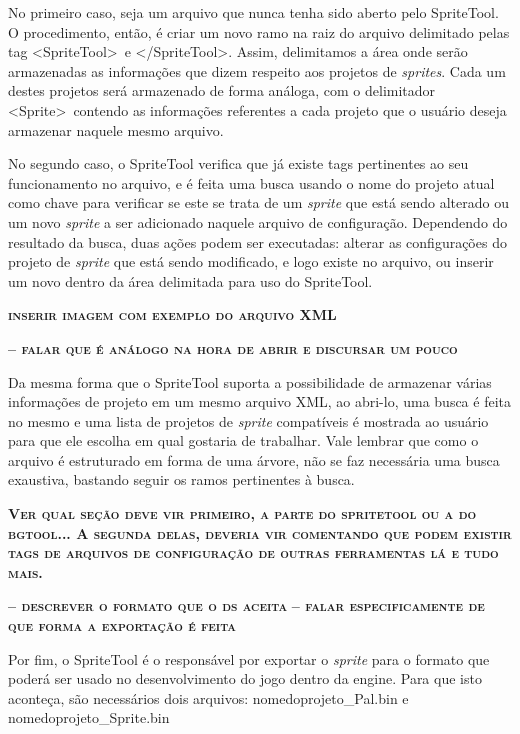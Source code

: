 \documentclass[brazil]{abnt}
\begin{document}
No primeiro caso, seja um arquivo que nunca tenha sido aberto pelo SpriteTool. O procedimento, então, é criar um novo ramo na raiz do arquivo delimitado pelas tag \textless SpriteTool\textgreater~e \textless /SpriteTool\textgreater. Assim, delimitamos a área onde serão armazenadas as informações que dizem respeito aos projetos de \textit{sprites}. Cada um destes projetos será armazenado de forma análoga, com o delimitador \textless Sprite\textgreater~contendo as informações referentes a cada projeto que o usuário deseja armazenar naquele mesmo arquivo. 

No segundo caso, o SpriteTool verifica que já existe tags pertinentes ao seu funcionamento no arquivo, e é feita uma busca usando o nome do projeto atual como chave para verificar se este se trata de um \textit{sprite} que está sendo alterado ou um novo \textit{sprite} a ser adicionado naquele arquivo de configuração. Dependendo do resultado da busca, duas ações podem ser executadas: alterar as configurações do projeto de \textit{sprite} que está sendo modificado, e logo existe no arquivo, ou inserir um novo dentro da área delimitada para uso do SpriteTool.

\textsc{\textbf{inserir imagem com exemplo do arquivo XML}}

\textsc{\textbf{-- falar que é análogo na hora de abrir e discursar um pouco}}

Da mesma forma que o SpriteTool suporta a possibilidade de armazenar várias informações de projeto em um mesmo arquivo XML, ao abri-lo, uma busca é feita no mesmo e uma lista de projetos de \textit{sprite} compatíveis é mostrada ao usuário para que ele escolha em qual gostaria de trabalhar. Vale lembrar que como o arquivo é estruturado em forma de uma árvore, não se faz necessária uma busca exaustiva, bastando seguir os ramos pertinentes à busca. 

\textsc{\textbf{Ver qual seção deve vir primeiro, a parte do spritetool ou a do bgtool... A segunda delas, deveria vir comentando que podem existir tags de arquivos de configuração de outras ferramentas lá e tudo mais.}}

\textsc{\textbf{-- descrever o formato que o ds aceita}}
\textsc{\textbf{-- falar especificamente de que forma a exportação é feita}}

Por fim, o SpriteTool é o responsável por exportar o \textit{sprite} para o formato que poderá ser usado no desenvolvimento do jogo dentro da engine. Para que isto aconteça, são necessários dois arquivos: nomedoprojeto\_Pal.bin e nomedoprojeto\_Sprite.bin
\end{document}
